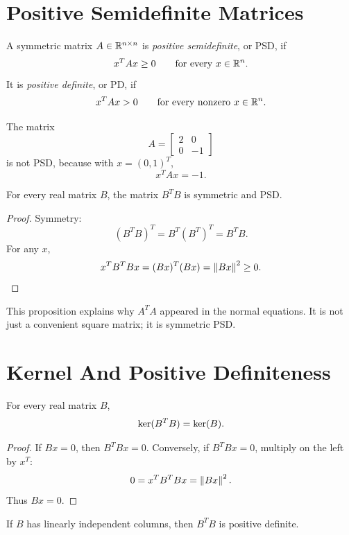 \section{Positive Semidefinite Matrices}

\begin{definition}
A symmetric matrix $A\in\mathbb{R}^{n\times n}$ is \emph{positive semidefinite}, or
PSD, if
\[
  x^TAx\geq 0
  \qquad\text{for every }x\in\mathbb{R}^n.
\]
It is \emph{positive definite}, or PD, if
\[
  x^TAx>0
  \qquad\text{for every nonzero }x\in\mathbb{R}^n.
\]
\end{definition}

\begin{example}
The matrix
\[
  A=\begin{bmatrix}2&0\\0&-1\end{bmatrix}
\]
is not PSD, because with $x=(0,1)^T$,
\[
  x^TAx=-1.
\]
\end{example}

\begin{proposition}
For every real matrix $B$, the matrix $B^TB$ is symmetric and PSD.
\end{proposition}

\begin{proof}
Symmetry:
\[
  (B^TB)^T=B^T(B^T)^T=B^TB.
\]
For any $x$,
\[
  x^TB^TBx=(Bx)^T(Bx)=\left\lVert Bx \right\rVert^2\geq 0.
\]
\end{proof}

This proposition explains why $A^TA$ appeared in the normal equations. It is
not just a convenient square matrix; it is symmetric PSD.

\section{Kernel And Positive Definiteness}

\begin{proposition}
For every real matrix $B$,
\[
  \operatorname{ker}(B^TB)=\operatorname{ker}(B).
\]
\end{proposition}

\begin{proof}
If $Bx=0$, then $B^TBx=0$. Conversely, if $B^TBx=0$, multiply on the left by
$x^T$:
\[
  0=x^TB^TBx=\left\lVert Bx \right\rVert^2.
\]
Thus $Bx=0$.
\end{proof}

\begin{corollary}
If $B$ has linearly independent columns, then $B^TB$ is positive definite.
\end{corollary}

